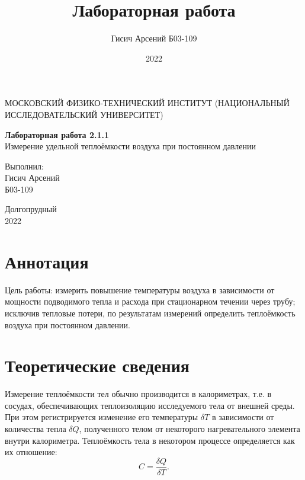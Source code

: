 \documentclass[a4paper, 12pt]{article}
\title{Лабораторная работа}
\author{Гисич Арсений Б03-109}
\date{2022}
\begin{document}
	\begin{center}
		{\large МОСКОВСКИЙ ФИЗИКО-ТЕХНИЧЕСКИЙ ИНСТИТУТ (НАЦИОНАЛЬНЫЙ ИССЛЕДОВАТЕЛЬСКИЙ УНИВЕРСИТЕТ)}
	\end{center}
	\vspace{5 cm}
	{\Large
		\begin{center}
			{\bf Лабораторная работа 2.1.1}\\[0.2 cm]
			Измерение удельной теплоёмкости воздуха при постоянном давлении
		\end{center}
	}
	\vspace{4 cm}
	\begin{flushright}
		{\Large Выполнил: \\
			\vspace{0.2 cm}
			Гисич Арсений \\
			\vspace{0.2 cm}
			Б03-109 \\}
	\end{flushright}
	\vspace{8 cm}
	\begin{center}
		Долгопрудный\\[0.1 cm]
		2022
	\end{center}
\thispagestyle{empty}

\section{Аннотация}

\par Цель работы: измерить повышение температуры воздуха в зависимости от мощности
подводимого тепла и расхода при стационарном течении через трубу; исключив тепловые потери, по результатам измерений определить теплоёмкость воздуха при постоянном давлении.

\section{Теоретические сведения}

Измерение теплоёмкости тел обычно производится в калориметрах, т.е. в сосудах, обеспечивающих теплоизоляцию исследуемого тела от внешней среды. При этом регистрируется изменение его температуры $\delta T$ в зависимости от количества тепла $\delta Q$, полученного телом от некоторого нагревательного элемента внутри калориметра. Теплоёмкость тела в некотором процессе определяется как их отношение:
\begin{equation}\label{1}
C = \dfrac{\delta Q}{\delta T}.
\end{equation}
\end{document}
